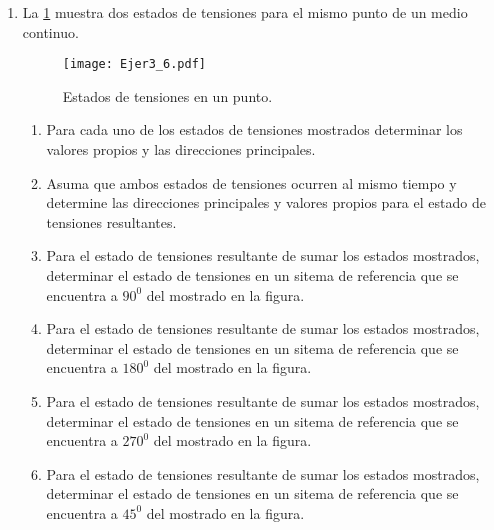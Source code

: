 \documentclass[../notas medios.tex]{subfiles}
\begin{document}
\begin{enumerate}
\item \label{punto06} La \cref{direcc} muestra dos estados de tensiones
para el mismo punto de un medio continuo. 
%
\begin{figure}[H]
	\centering
	\texttt{[image: Ejer3\_6.pdf]}
	\caption{Estados de tensiones en un punto.}
	\label{direcc}
\end{figure}
%
\begin{enumerate}
	\item Para cada uno de los estados de tensiones mostrados determinar los
valores propios y las direcciones principales.
	\item Asuma que ambos estados de tensiones ocurren al mismo tiempo y determine
las direcciones principales y valores propios para el estado de tensiones resultantes.
	\item Para el estado de tensiones resultante de sumar los estados mostrados,
determinar el estado de tensiones en un sitema de referencia que se encuentra a $90^0$ del mostrado en la figura.
	\item Para el estado de tensiones resultante de sumar los estados mostrados,
determinar el estado de tensiones en un sitema de referencia que se encuentra a $180^0$ del mostrado en la figura.
	\item Para el estado de tensiones resultante de sumar los estados mostrados,
determinar el estado de tensiones en un sitema de referencia que se encuentra a $270^0$ del mostrado en la figura.
	\item Para el estado de tensiones resultante de sumar los estados mostrados,
determinar el estado de tensiones en un sitema de referencia que se encuentra a $45^0$ del mostrado en la figura.
\end{enumerate}
%


\end{enumerate}
\end{document}
